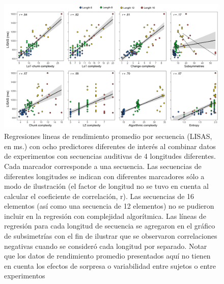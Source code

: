 \begin{figure}[t!]
      \includegraphics[scale=0.8]{figuras/plosbio/journal.pcbi.1008598.g009.PNG}
     
      \centering

      \caption{Regresiones lineas de rendimiento promedio por secuencia (LISAS, en ms.) con ocho predictores diferentes de interés al combinar datos de experimentos con secuencias auditivas de 4 longitudes diferentes. Cada marcador corresponde a una secuencia. Las secuencias de diferentes longitudes se indican con diferentes marcadores sólo a modo de ilustración (el factor de longitud no se tuvo en cuenta al calcular el coeficiente de correlación, r). Las secuencias de 16 elementos (así como una secuencia de 12 elementos) no se pudieron incluir en la regresión con complejidad algorítmica. Las líneas de regresión para cada longitud de secuencia se agregaron en el gráfico de subsimetrías con el fin de ilustrar que se observaron correlaciones negativas cuando se consideró cada longitud por separado. Notar que los datos de rendimiento promedio presentados aquí no tienen en cuenta los efectos de sorpresa o variabilidad entre sujetos o entre experimentos}
      \label{PlosBIO-F9}
\end{figure}


